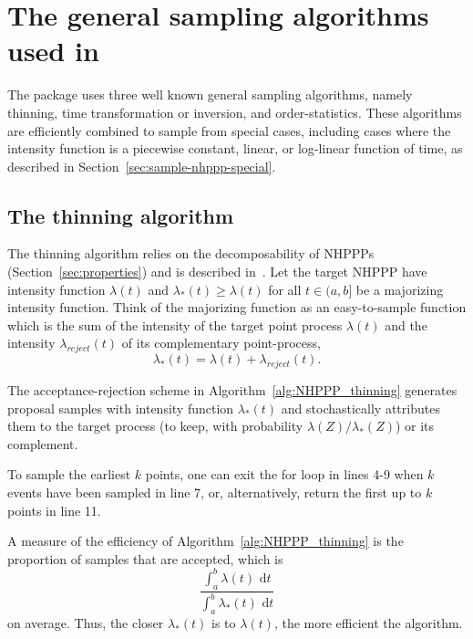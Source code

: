 \documentclass[article,nojss]{jss}\usepackage[]{graphicx}\usepackage[]{xcolor}
\begin{document}
\section[The general sampling algorithms used in nhppp]{The general sampling algorithms used in }\label{sec:general-sampling}

The  package uses three well known general sampling algorithms, namely thinning, time transformation or inversion, and order-statistics. These algorithms are efficiently combined to sample from special cases, including cases where the intensity function is a piecewise constant, linear, or log-linear function of time, as described in Section~\ref{sec:sample-nhppp-special}.

\subsection{The thinning algorithm}\label{sec:thinning}
The thinning algorithm relies on the decomposability of NHPPPs (Section~\ref{sec:properties}) and is described in~\citet{lewis1979thinning}. Let the target NHPPP have intensity function $\lambda(t)$ and $\lambda_*(t) \ge \lambda(t)$ for all $t \in (a, b]$ be a majorizing intensity function. Think of the majorizing function as an easy-to-sample function which is the sum of the intensity of the target point process $\lambda(t)$ and the intensity $\lambda_{reject}(t)$ of its complementary point-process,
$$\lambda_*(t) = \lambda(t) + \lambda_{reject}(t).$$

The acceptance-rejection scheme in Algorithm~\ref{alg:NHPPP_thinning} generates proposal samples with intensity function $\lambda_*(t)$ and stochastically attributes them to the target process (to keep, with probability $\lambda(Z)/\lambda_*(Z)$) or its complement.



To sample the earliest $k$ points, one can exit the for loop in lines 4-9 when $k$ events have been sampled in line 7, or, alternatively, return the first up to $k$ points in line 11.

A measure of the efficiency of Algorithm~\ref{alg:NHPPP_thinning} is the proportion of samples that are accepted, which is
\begin{equation}\label{eq:thinning-efficiency}
\frac{\int_a^b{\lambda(t) \textrm{ d}t}}{\int_a^b{\lambda_*(t) \textrm{ d}t}}
\end{equation}
on average. Thus, the closer $\lambda_*(t)$ is to $\lambda(t)$, the more efficient the algorithm.
\end{document}
